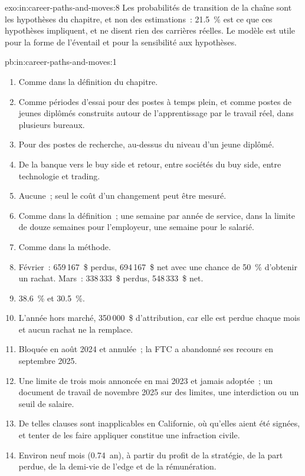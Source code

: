\begin{solution}{exo:in:career-paths-and-moves:8}
Les probabilités de transition de la chaîne sont les hypothèses du chapitre, et non des estimations~: 21.5~\% est ce que ces hypothèses
impliquent, et ne disent rien des carrières réelles. Le modèle est utile pour la forme de l'éventail et pour la sensibilité
aux hypothèses.
\end{solution}

\begin{solution}{pb:in:career-paths-and-moves:1}
\begin{enumerate}
\item Comme dans la définition du chapitre.
\item Comme périodes d'essai pour des postes à temps plein, et comme postes de jeunes diplômés construits autour de l'apprentissage par le travail réel, dans plusieurs bureaux.
\item Pour des postes de recherche, au-dessus du niveau d'un jeune diplômé.
\item De la banque vers le buy side et retour, entre sociétés du buy side, entre technologie et trading.
\item Aucune~; seul le coût d'un changement peut être mesuré.
\item Comme dans la définition~; une semaine par année de service, dans la limite de douze semaines pour l'employeur, une semaine pour le salarié.
\item Comme dans la méthode.
\item Février~: 659\,167~\$ perdus, 694\,167~\$ net avec une chance de 50~\% d'obtenir un rachat. Mars~: 338\,333~\$ perdus, 548\,333~\$
net.
\item 38.6~\% et 30.5~\%.
\item L'année hors marché, 350\,000~\$ d'attribution, car elle est perdue chaque mois et aucun rachat ne la remplace.
\item Bloquée en août 2024 et annulée~; la FTC a abandonné ses recours en septembre 2025.
\item Une limite de trois mois annoncée en mai 2023 et jamais adoptée~; un document de travail de novembre 2025 sur des limites, une interdiction ou
un seuil de salaire.
\item De telles clauses sont inapplicables en Californie, où qu'elles aient été signées, et tenter de les faire appliquer constitue une
infraction civile.
\item Environ neuf mois (0.74~an), à partir du profit de la stratégie, de la part perdue, de la demi-vie de l'edge et de la rémunération.

\end{enumerate}
\end{solution}
